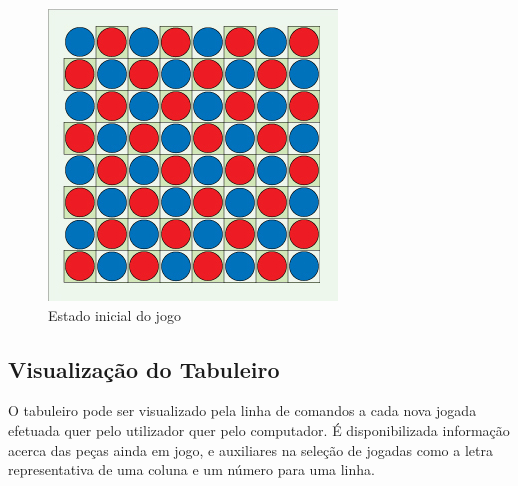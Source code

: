 \documentclass[a4paper]{article}
\begin{document}
\begin{figure}[H]
    \center
    \includegraphics[scale=0.8]{resources/initial-state.jpg}
    \caption{Estado inicial do jogo}
    \label{fig:initial-state.png}
\end{figure}

\subsection{Visualização do Tabuleiro}

O tabuleiro pode ser visualizado pela linha de comandos a cada nova jogada efetuada quer pelo utilizador quer pelo computador.
É disponibilizada informação acerca das peças ainda em jogo, e auxiliares na seleção de jogadas como a letra representativa de uma coluna e um número para uma linha.
\end{document}
